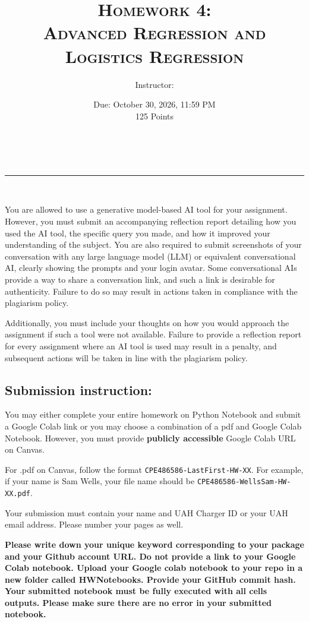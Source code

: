 \documentclass[12pt, xcolor=dvipsnames,svgnames,x11names]{article}
\makeatletter
\newcommand{\hdrrule}{{\color{hdrcoral}\rule{4.5em}{1.1pt}}}
\renewcommand{\maketitle}{%
      \begin{center}
         \begin{tcolorbox}[
               enhanced,
               colback=white,
               colframe=hdrslate,
               boxrule=0.8pt,
               arc=4pt,
               left=0pt,
               right=0pt,
               top=0pt,
               bottom=0pt,
               drop shadow={hdrslate!35!white},
         ]
               \begin{tcolorbox}[
                  enhanced,
                  colback=hdrplum,
                  colframe=hdrplum,
                  boxrule=0pt,
                  arc=4pt,
                  sharp corners=south,
                  left=2em,
                  right=2em,
                  top=1.1em,
                  bottom=1.1em,
                  borderline south={2.2pt}{0pt}{hdrcoral},
               ]
                  \centering
                  {\LARGE\color{white}\linespread{1.25}\selectfont\@title}
               \end{tcolorbox}

               \vspace{1.1em}
               \centering
               {\large\color{hdrslate}\@author}\\[0.7em]
               \hdrrule\\[0.7em]
               {\normalsize\color{hdrplum}\@date}
               \vspace{1.1em}
         \end{tcolorbox}
      \end{center}
      \vspace{1.5em}
}
\newcommand{\hw}{Homework 4:\\\normalsize Advanced Regression and Logistics Regression}
\newcommand{\duedate}{October 30, 2026, 11:59 PM}
\makeatother
\begin{document}
\title{\textsc{\hw\\
\coursenumber}}
\author{Instructor: \instructorname}
\date{Due: \duedate\\ 125 Points}

\maketitle

\setlength{\unitlength}{1in}
You are allowed to use a generative model-based AI tool for your assignment. However, you must submit an accompanying reflection report detailing how you used the AI tool, the specific query you made, and how it improved your understanding of the subject. You are also required to submit screenshots of your conversation with any large language model (LLM) or equivalent conversational AI, clearly showing the prompts and your login avatar. Some conversational AIs provide a way to share a conversation link, and such a link is desirable for authenticity. Failure to do so may result in actions taken in compliance with the plagiarism policy.

Additionally, you must include your thoughts on how you would approach the assignment if such a tool were not available. Failure to provide a reflection report for every assignment where an AI tool is used may result in a penalty, and subsequent actions will be taken in line with the plagiarism policy.

\subsection*{Submission instruction:}
You may either complete your entire homework on Python Notebook  and submit a Google Colab link or you may choose a combination of a pdf and Google Colab Notebook. However, you must provide \textbf{publicly accessible} Google Colab URL on Canvas.

For .pdf on Canvas, follow the format  \texttt{CPE486586-LastFirst-HW-XX}. For example, if your name is Sam Wells, your file name should be \texttt{CPE486586-WellsSam-HW-XX.pdf}.

Your submission must contain your name and UAH Charger ID or your UAH email address.  Please number your pages as well.

\textbf{Please write down your unique keyword corresponding to your package and your Github account URL. Do not provide a link to your Google Colab notebook. Upload your Google colab notebook to your repo in a new folder called \textbf{HWNotebooks}. Provide your GitHub commit hash. Your submitted notebook must be fully executed with all cells outputs. Please make sure there are no error in your submitted notebook.}
\end{document}

